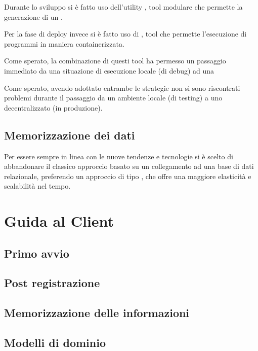       Durante lo sviluppo si è fatto uso dell'utility \footnotemark {} , tool modulare che permette la generazione di un \footnotemark {} .

      Per la fase di deploy invece si è fatto uso di , tool che permette l'esecuzione di programmi in maniera containerizzata.

      Come sperato, la combinazione di questi tool ha permesso un passaggio immediato da una situazione di esecuzione locale (di debug) ad una 

      Come sperato, avendo adottato entrambe le strategie non si sono riscontrati problemi durante il passaggio da un ambiente locale (di testing) a uno decentralizzato (in produzione).
    \subsection{Memorizzazione dei dati}
        Per essere sempre in linea con le nuove tendenze e tecnologie si è scelto di abbandonare il classico approccio basato su un collegamento ad una base di dati relazionale, preferendo un approccio di tipo \footnotemark {} , che offre una maggiore elasticità e scalabilità nel tempo.
    \newpage

  \section{Guida al Client}
    \subsection{Primo avvio}
    \subsection{Post registrazione}
    \subsection{Memorizzazione delle informazioni}
    \subsection{Modelli di dominio}
      \begin{center}
      \end{center}

      \begin{center}
      \end{center}
    \newpage
